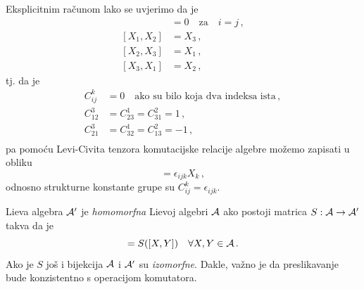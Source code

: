 \begin{primjer}
Eksplicitnim računom lako se uvjerimo da je
 \begin{align}
     [X_i,X_j]& =0 \quad\text{za}\quad i=j \,,  \\
     [X_1,X_2]& = X_3 \,, \\
     [X_2,X_3]& = X_1  \,, \\
     [X_3,X_1]& = X_2 \,,
 \end{align}
tj. da je
\begin{align}
 C_{ij}^{k}& = 0 \quad\text{ako su bilo koja dva indeksa ista} \,, \\
 C_{12}^3  & = C_{23}^{1}=C_{31}^{2}=1 \,, \\
 C_{21}^3  & = C_{32}^{1}=C_{13}^{2}=-1 \,, \\
 \end{align}
pa pomoću Levi-Civita tenzora
komutacijske relacije algebre  možemo zapisati u obliku
\begin{equation}
 [X_i, X_j]=\epsilon_{ijk} X_k  \,,
  \label{eq:algebraso3}
\end{equation}
odnosno strukturne konstante grupe  su $C_{ij}^{k} = \epsilon_{ijk}$.
\end{primjer}


Lieva algebra $\mathcal{A}'$ je \emph{homomorfna} Lievoj algebri $\mathcal{A}$ ako postoji 
matrica $S:\mathcal{A}\to\mathcal{A}'$ takva da je
\begin{displaymath}
       [S(X), S(Y)]=S([X,Y]) \quad \forall X, Y \in\calA \,.
\end{displaymath}
Ako je $S$ još i bijekcija $\mathcal{A}$ i $\mathcal{A}'$ su \emph{izomorfne}. Dakle,
važno je da preslikavanje  bude konzistentno s operacijom komutatora.

